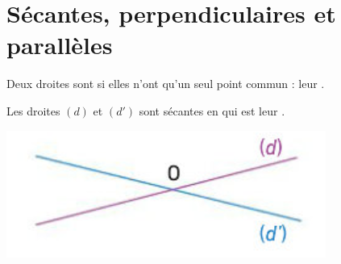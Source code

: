 \documentclass[xcolor={dvipsnames}]{beamer}
\begin{document}
\section{Sécantes, perpendiculaires et parallèles}

\begin{frame}
	\begin{mydef}
		Deux droites sont  si elles n'ont qu'un seul point commun : leur .
	\end{mydef}


	\begin{myex}
		
			Les droites $(d)$ et $(d')$ sont sécantes en \hspace*{1cm} qui est leur \hspace*{5cm}. \\
			
			\begin{center}
				\includegraphics[scale=0.5]{../img/sec}
			\end{center}
		
		
	\end{myex}
\end{frame}
\end{document}
